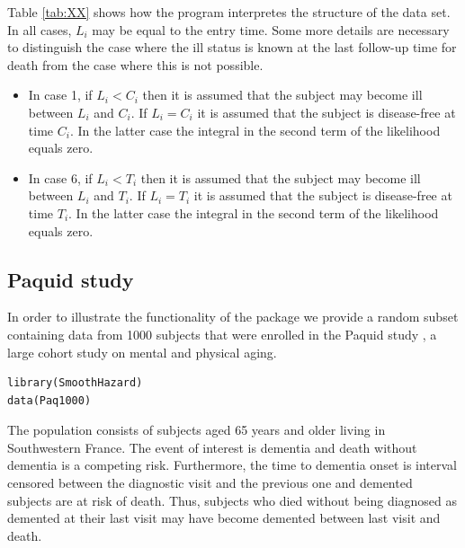 \documentclass[article]{jss}
\begin{document}
Table \ref{tab:XX} shows how the program interpretes the structure of the data
set. In all cases, \(L_i\) may be equal to the entry time. 
Some more details are necessary to distinguish the case where the
ill status is known at the last follow-up time for death from the case where
this is not possible. 

\begin{itemize}
\item In case 1, if \(L_i<C_i\) then it is assumed that the subject may
become ill between \(L_i\) and \(C_i\). If \(L_i=C_i\) it is assumed that
the subject is disease-free at time \(C_i\). In the latter case the
integral in the second term of the likelihood equals zero.
\item In case 6, if  \(L_i<T_i\) then it is assumed that the subject may
become ill between \(L_i\) and \(T_i\). If \(L_i=T_i\) it is assumed that
the subject is disease-free at time \(T_i\). In the latter case the
integral in the second term of the likelihood equals zero.
\end{itemize}

\subsection{Paquid study}
\label{sec-5-2}
In order to illustrate the functionality of the package we provide a
random subset containing data from 1000 subjects that were enrolled in
the Paquid study \citep{letenneur1999sex}, a large cohort study on
mental and physical aging.
\lstset{language=R,label= ,caption= ,numbers=none}
\begin{lstlisting}
library(SmoothHazard)
data(Paq1000)
\end{lstlisting}
The population consists of subjects aged 65 years and older living in
Southwestern France. 
The event of interest is dementia and death without
dementia is a competing risk. Furthermore, the time to dementia onset
is interval censored between the diagnostic visit and the previous one 
and demented subjects are at risk of death.
Thus, subjects who died without being diagnosed as demented at their last visit 
may have become demented between last visit and death.
\end{document}
